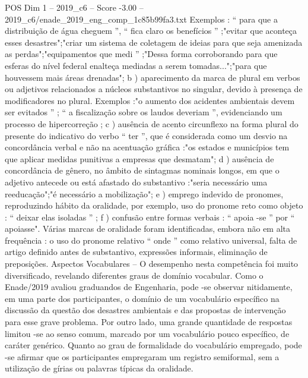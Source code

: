 \begin{textsample}{POS Dim 1 – 2019\_c6 – Score -3.00 – 2019\_c6/enade\_2019\_eng\_comp\_1c85b99fa3.txt}
Exemplos : “ para que a distribuição de água cheguem ”, “ fica claro os benefícios ” ;"evitar que aconteça esses desastres";"criar um sistema de coletagem de ideias para que seja amenizada as perdas";"equipamentos que medi ” ;"Dessa forma corroborando para que esferas do nível federal enalteça mediadas a serem tomadas...";"para que houvessem mais áreas drenadas"; b ) aparecimento da marca de plural em verbos ou adjetivos relacionados a núcleos substantivos no singular, devido à presença de modificadores no plural.
Exemplos :"o aumento dos acidentes ambientais devem ser evitados ” ; “ a fiscalização sobre os laudos deveriam ”, evidenciando um processo de hipercorreção ; c ) ausência de acento circunflexo na forma plural do presente do indicativo do verbo “ ter ”, que é considerada como um desvio na concordância verbal e não na acentuação gráfica :"os estados e municípios tem que aplicar medidas punitivas a empresas que desmatam"; d ) ausência de concordância de gênero, no âmbito de sintagmas nominais longos, em que o adjetivo antecede ou está afastado do substantivo :"seria necessário uma reeducação";"é necessário a mobilização"; e ) emprego indevido de pronomes, reproduzindo hábito da oralidade, por exemplo, uso do pronome reto como objeto : “ deixar elas isoladas ” ; f ) confusão entre formas verbais : “ apoia -se ” por “ apoiasse".
Várias marcas de oralidade foram identificadas, embora não em alta frequência : o uso do pronome relativo “ onde ” como relativo universal, falta de artigo definido antes de substantivo, expressões informais, eliminação de preposições.
Aspectos Vocabulares – O desempenho nesta competência foi muito diversificado, revelando diferentes graus de domínio vocabular.
Como o Enade/2019 avaliou graduandos de Engenharia, pode -se observar nitidamente, em uma parte dos participantes, o domínio de um vocabulário específico na discussão da questão dos desastres ambientais e das propostas de intervenção para esse grave problema.
Por outro lado, uma grande quantidade de respostas limitou -se ao senso comum, marcado por um vocabulário pouco específico, de caráter genérico.
Quanto ao grau de formalidade do vocabulário empregado, pode -se afirmar que os participantes empregaram um registro semiformal, sem a utilização de gírias ou palavras típicas da oralidade.

\end{textsample}
